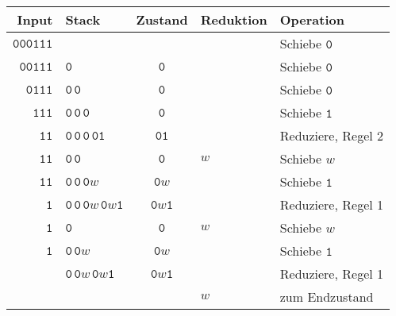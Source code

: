 \begin{center}
\begin{tabular}{|r|l|c|l|l|}
\hline
Input&Stack&Zustand&Reduktion&Operation\\
\hline
$\texttt{000111}$
	&
		&&&Schiebe $\texttt{0}$\\
$\texttt{00111}$
	&$\boxed{\texttt{0}}$
		&$\boxed{\texttt{0}}$&&Schiebe $\texttt{0}$\\
$\texttt{0111}$
	&$\boxed{\texttt{0}}\,\boxed{\texttt{0}}$
		&$\boxed{\texttt{0}}$&&Schiebe $\texttt{0}$\\
$\texttt{111}$
	&$\boxed{\texttt{0}}\,\boxed{\texttt{0}}\,\boxed{\texttt{0}}$
		&$\boxed{\texttt{0}}$&&Schiebe $\texttt{1}$\\
$\texttt{11}$
	&$\boxed{\texttt{0}}\,\boxed{\texttt{0}}\,\boxed{\texttt{0}}\,\boxed{\texttt{01}}$
		&$\boxed{\texttt{01}}$&&Reduziere, Regel 2\\
$\texttt{11}$
	&$\boxed{\texttt{0}}\,\boxed{\texttt{0}}$
		&$\boxed{\texttt{0}}$&$w$&Schiebe $w$\\
$\texttt{11}$
	&$\boxed{\texttt{0}}\,\boxed{\texttt{0}}\,\boxed{\texttt{0}w}$
		&$\boxed{\texttt{0}w}$&&Schiebe $\texttt{1}$\\
$\texttt{1}$
	&$\boxed{\texttt{0}}\,\boxed{\texttt{0}}\,\boxed{\texttt{0}w}\,\boxed{\texttt{0}w\texttt{1}}$
		&$\boxed{\texttt{0}w\texttt{1}}$&&Reduziere, Regel 1\\
$\texttt{1}$
	&$\boxed{\texttt{0}}$
		&$\boxed{\texttt{0}}$&$w$&Schiebe $w$\\
$\texttt{1}$
	&$\boxed{\texttt{0}}\,\boxed{\texttt{0}w}$
		&$\boxed{\texttt{0}w}$&&Schiebe $\texttt{1}$\\
	&$\boxed{\texttt{0}}\,\boxed{\texttt{0}w}\,\boxed{\texttt{0}w\texttt{1}}$
		&$\boxed{\texttt{0}w\texttt{1}}$&&Reduziere, Regel 1\\
	&
		&$\boxed{\phantom{\texttt{0}}}$&$w$&zum Endzustand\\
\hline
\end{tabular}
\end{center}
